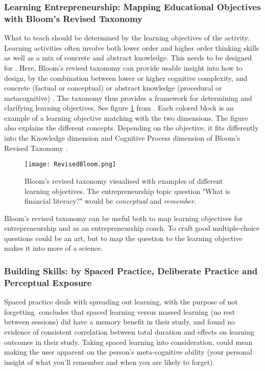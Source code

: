 
  \subsubsection{Learning Entrepreneurship: Mapping Educational Objectives with Bloom's Revised Taxonomy}

  What to teach should be determined by the learning objectives of the activity. Learning activities often involve both lower order and higher order thinking skills as well as a mix of concrete and abstract knowledge. This needs to be designed for . Here, Bloom's revised taxonomy can provide usable insight into how to design, by the combination between lower or higher cognitive complexity, and concrete (factual or conceptual) or abstract knowledge (procedural or metacognitive) \citep{cheong}. The taxonomy thus provides a framework for determining and clarifying learning objectives. See figure \ref{fig:revised-bloom} from \cite{heer}. Each colored block is an example of a learning objective matching with the two dimensions. The figure also explains the different concepts. Depending on the objective, it fits differently into the Knowledge dimension and Cognitive Process dimension of Bloom's Revised Taxonomy \citep{krathwohl}.

  \begin{figure}[h]
    \centering
    \texttt{[image: RevisedBloom.png]}
    \caption{Bloom's revised taxonomy visualised with examples of different learning objectives. The entrepreneurship topic question "What is financial literacy?" would be \textit{conceptual} and \textit{remember}. }
    \label{fig:revised-bloom}
\end{figure}

  Bloom's revised taxonomy can be useful both to map learning objectives for entrepreneurship and as an entrepreneurship coach. To craft good multiple-choice questions could be an art, but to map the question to the learning objective makes it into more of a science.

  \subsubsection{Building Skills: by Spaced Practice, Deliberate Practice and Perceptual Exposure}

  Spaced practice deals with spreading out learning, with the purpose of not forgetting. \cite{gates} concludes that spaced learning versus massed learning (no rest between sessions) did have a memory benefit in their study, and found no evidence of consistent correlation between total duration and effects on learning outcomes in their study. Taking spaced learning into consideration, could mean making the user apparent on the person's meta-cognitive ability (your personal insight of what you'll remember and when you are likely to forget).

